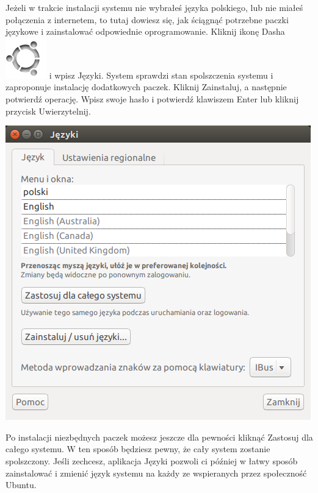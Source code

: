 Jeżeli w trakcie instalacji systemu nie wybrałeś języka polskiego, lub nie miałeś połączenia z internetem, to tutaj dowiesz się, jak ściągnąć potrzebne paczki językowe i zainstalować odpowiednie oprogramowanie.
Kliknij ikonę Dasha \includegraphics[scale=0.35]{images/ikony_dash.png} i wpisz \textcolor{ubuntu_orange}{Języki}. System sprawdzi stan spolszczenia systemu i zaproponuje instalację dodatkowych paczek. Kliknij \textcolor{ubuntu_orange}{Zainstaluj}, a następnie potwierdź operację. Wpisz swoje hasło i potwierdź klawiszem Enter lub kliknij przycisk \textcolor{ubuntu_orange}{Uwierzytelnij}.

\begin{center}
	\vspace{-10pt}
	\includegraphics{images/pierwsze_uruchomienie_lang2.png}
\end{center}

Po instalacji niezbędnych paczek możesz jeszcze dla pewności kliknąć \textcolor{ubuntu_orange}{Zastosuj dla całego systemu}. W ten sposób będziesz pewny, że cały system zostanie spolszczony.
Jeśli zechcesz, aplikacja \textcolor{ubuntu_orange}{Języki} pozwoli ci później w łatwy sposób zainstalować i zmienić język systemu na każdy ze wspieranych przez społeczność Ubuntu.
\clearpage
